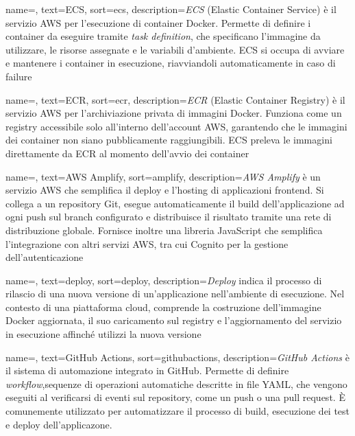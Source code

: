  {
    name=,
    text=ECS,
    sort=ecs,
    description={\emph{ECS} (Elastic Container Service) è il servizio AWS per l'esecuzione di container Docker. Permette di definire i container da eseguire tramite \emph{task definition}, che specificano l'immagine da utilizzare, le risorse assegnate e le variabili d'ambiente. ECS si occupa di avviare e mantenere i container in esecuzione, riavviandoli automaticamente in caso di failure}
}

 {
    name=,
    text=ECR,
    sort=ecr,
    description={\emph{ECR} (Elastic Container Registry) è il servizio AWS per l'archiviazione privata di immagini Docker. Funziona come un registry accessibile solo all'interno dell'account AWS, garantendo che le immagini dei container non siano pubblicamente raggiungibili. ECS preleva le immagini direttamente da ECR al momento dell'avvio dei container}
}

 {
    name=,
    text=AWS Amplify,
    sort=amplify,
    description={\emph{AWS Amplify} è un servizio AWS che semplifica il deploy e l'hosting di applicazioni frontend. Si collega a un repository Git, esegue automaticamente il build dell'applicazione ad ogni push sul branch configurato e distribuisce il risultato tramite una rete di distribuzione globale. Fornisce inoltre una libreria JavaScript che semplifica l'integrazione con altri servizi AWS, tra cui Cognito per la gestione dell'autenticazione}
}

 {
    name=,
    text=deploy,
    sort=deploy,
    description={\emph{Deploy} indica il processo di rilascio di una nuova versione di un'applicazione nell'ambiente di esecuzione. Nel contesto di una piattaforma cloud, comprende la costruzione dell'immagine Docker aggiornata, il suo caricamento sul registry e l'aggiornamento del servizio in esecuzione affinché utilizzi la nuova versione}
}

 {
    name=,
    text=GitHub Actions,
    sort=githubactions,
    description={\emph{GitHub Actions} è il sistema di automazione integrato in GitHub. Permette di definire \emph{workflow},sequenze di operazioni automatiche descritte in file YAML, che vengono eseguiti al verificarsi di eventi sul repository, come un push o una pull request. È comunemente utilizzato per automatizzare il processo di build, esecuzione dei test e deploy dell'applicazone.}
}

